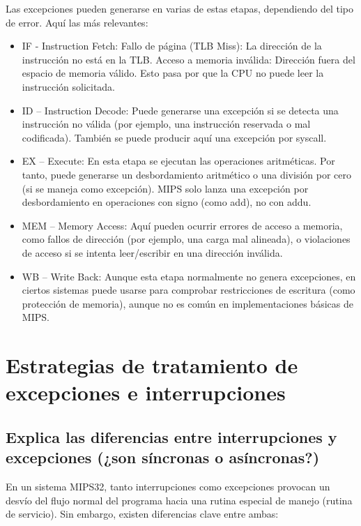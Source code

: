 \documentclass{article}
\begin{document}
Las excepciones pueden generarse en varias de estas etapas, dependiendo del tipo de error. Aquí las más relevantes:
\begin{itemize}
    \item IF - Instruction Fetch: Fallo de página (TLB Miss): La dirección de la instrucción no está en la TLB. Acceso a memoria inválida: Dirección fuera del espacio de memoria válido. Esto pasa por que la CPU no puede leer la instrucción solicitada.
    \item ID – Instruction Decode: Puede generarse una excepción si se detecta una instrucción no válida (por ejemplo, una instrucción reservada o mal codificada). También se puede producir aquí una excepción por syscall.
    \item EX – Execute: En esta etapa se ejecutan las operaciones aritméticas. Por tanto, puede generarse un desbordamiento aritmético o una división por cero (si se maneja como excepción). MIPS solo lanza una excepción por desbordamiento en operaciones con signo (como add), no con addu.
    \item MEM – Memory Access: Aquí pueden ocurrir errores de acceso a memoria, como fallos de dirección (por ejemplo, una carga mal alineada), o violaciones de acceso si se intenta leer/escribir en una dirección inválida.
    \item WB – Write Back: Aunque esta etapa normalmente no genera excepciones, en ciertos sistemas puede usarse para comprobar restricciones de escritura (como protección de memoria), aunque no es común en implementaciones básicas de MIPS.
\end{itemize}

\section{Estrategias de tratamiento de excepciones e interrupciones}

\subsection{Explica las diferencias entre interrupciones y excepciones (¿son síncronas o asíncronas?)}

En un sistema MIPS32, tanto interrupciones como excepciones provocan un desvío del flujo normal del programa hacia una rutina especial de manejo (rutina de servicio). Sin embargo, existen diferencias clave entre ambas:
\end{document}
